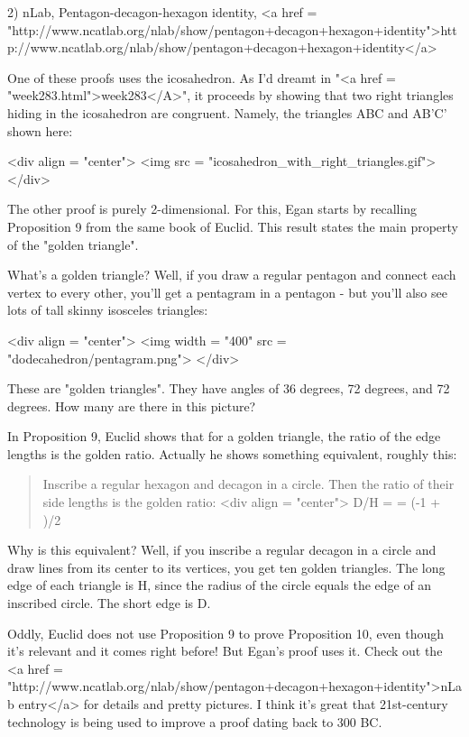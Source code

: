 2) nLab, Pentagon-decagon-hexagon identity, 
<a href = "http://www.ncatlab.org/nlab/show/pentagon+decagon+hexagon+identity">http://www.ncatlab.org/nlab/show/pentagon+decagon+hexagon+identity</a>

One of these proofs uses the icosahedron.  As I'd dreamt in "<a
href = "week283.html">week283</A>", it proceeds by showing that
two right triangles hiding in the icosahedron are congruent.
Namely, the triangles ABC and AB'C' shown here:

<div align = "center">
<img src = "icosahedron_with_right_triangles.gif">
</div>

The other proof is purely 2-dimensional.  For this, Egan starts
by recalling Proposition 9 from the same book of Euclid.  This result
states the main property of the "golden triangle".

What's a golden triangle?  Well, if you draw a regular pentagon and
connect each vertex to every other, you'll get a pentagram in a
pentagon - but you'll also see lots of tall skinny isosceles
triangles:

<div align = "center">
<img width = "400" src = "dodecahedron/pentagram.png">
</div>


These are "golden triangles".  They have angles
of 36 degrees, 72 degrees, and 72 degrees.  How many are there
in this picture?

In Proposition 9, Euclid shows that for a golden triangle, the ratio
of the edge lengths is the golden ratio.  Actually he shows something
equivalent, roughly this:

\begin{quote}
 Inscribe a regular hexagon and decagon in a circle.  Then the ratio
 of their side lengths is the golden ratio: 
<div align = "center">
D/H = \phi  = (-1 + )/2
\end{quote}

Why is this equivalent?  Well, if you inscribe a regular decagon in a
circle and draw lines from its center to its vertices, you get ten
golden triangles.  The long edge of each triangle is H, since the
radius of the circle equals the edge of an inscribed circle.  The
short edge is D.

Oddly, Euclid does not use Proposition 9 to prove Proposition 10, even
though it's relevant and it comes right before!  But Egan's proof uses
it.  Check out the <a href =
"http://www.ncatlab.org/nlab/show/pentagon+decagon+hexagon+identity">nLab
entry</a> for details and pretty pictures.  I think it's great that
21st-century technology is being used to improve a proof dating back to 300 BC.

